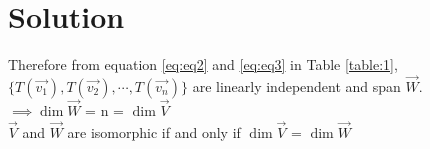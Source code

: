\documentclass[journal,12pt,twocolumn]{IEEEtran}
\begin{document}
\section{Solution}
Therefore from equation \eqref{eq:eq2} and \eqref{eq:eq3} in Table \ref{table:1}, $\{T(\vec{v_1}), T(\vec{v_2}),\cdots,T(\vec{v_n})\}$ are linearly independent and span $\vec{W}$.\\

$\implies \dim{\vec{W}}$ = n = $\dim{\vec{V}}$\\

$\vec{V}$ and $\vec{W}$ are isomorphic if and only if $\dim{\vec{V}}$ = $\dim{\vec{W}}$
\\
\end{document}
